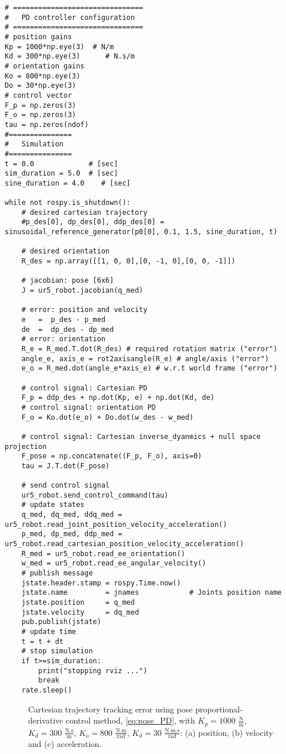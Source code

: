 \begin{lstlisting}
# ===============================
#   PD controller configuration
# ===============================
# position gains
Kp = 1000*np.eye(3)  # N/m
Kd = 300*np.eye(3)      # N.s/m
# orientation gains
Ko = 800*np.eye(3)   
Do = 30*np.eye(3)
# control vector
F_p = np.zeros(3)    
F_o = np.zeros(3)
tau = np.zeros(ndof)
#===============
#   Simulation
#===============
t = 0.0             # [sec] 
sim_duration = 5.0  # [sec]
sine_duration = 4.0    # [sec]

while not rospy.is_shutdown():
    # desired cartesian trajectory
    #p_des[0], dp_des[0], ddp_des[0] = sinusoidal_reference_generator(p0[0], 0.1, 1.5, sine_duration, t)
    
    # desired orientation
    R_des = np.array([[1, 0, 0],[0, -1, 0],[0, 0, -1]])
    
    # jacobian: pose [6x6]
    J = ur5_robot.jacobian(q_med)  

    # error: position and velocity
    e 	=  p_des - p_med
    de 	=  dp_des - dp_med    
    # error: orientation
    R_e = R_med.T.dot(R_des) # required rotation matrix ("error")
    angle_e, axis_e = rot2axisangle(R_e) # angle/axis ("error")
    e_o = R_med.dot(angle_e*axis_e) # w.r.t world frame ("error")

    # control signal: Cartesian PD
    F_p = ddp_des + np.dot(Kp, e) + np.dot(Kd, de)
    # control signal: orientation PD
    F_o = Ko.dot(e_o) + Do.dot(w_des - w_med)
    
    # control signal: Cartesian inverse_dyanmics + null space projection
    F_pose = np.concatenate((F_p, F_o), axis=0)
    tau = J.T.dot(F_pose) 
    
    # send control signal
    ur5_robot.send_control_command(tau)
    # update states
    q_med, dq_med, ddq_med = ur5_robot.read_joint_position_velocity_acceleration()
    p_med, dp_med, ddp_med = ur5_robot.read_cartesian_position_velocity_acceleration()
    R_med = ur5_robot.read_ee_orientation()
    w_med = ur5_robot.read_ee_angular_velocity()
    # publish message
    jstate.header.stamp = rospy.Time.now()
    jstate.name 		= jnames			# Joints position name
    jstate.position 	= q_med
    jstate.velocity 	= dq_med
    pub.publish(jstate)
    # update time
    t = t + dt
    # stop simulation
    if t>=sim_duration:
        print("stopping rviz ...")
        break
    rate.sleep()
\end{lstlisting}

\begin{figure}%
	\centering
	\caption{Cartesian trajectory tracking error using pose proportional-derivative control method, \eqref{eq:pose_PD}, with  ${K_{p}}=1000$ $\mathrm{\frac{N}{m}}$, $K_{d}= 300$ $\mathrm{\frac{N.s}{m}}$, ${K_{o}}=800$ $\mathrm{\frac{N.m}{rad}}$, $K_{d}= 30$ $\mathrm{\frac{N.m.s}{rad}}$: (a) position, (b) velocity and (c) acceleration.}
	\label{fig:act_3.1_ee_position_error}
\end{figure}

